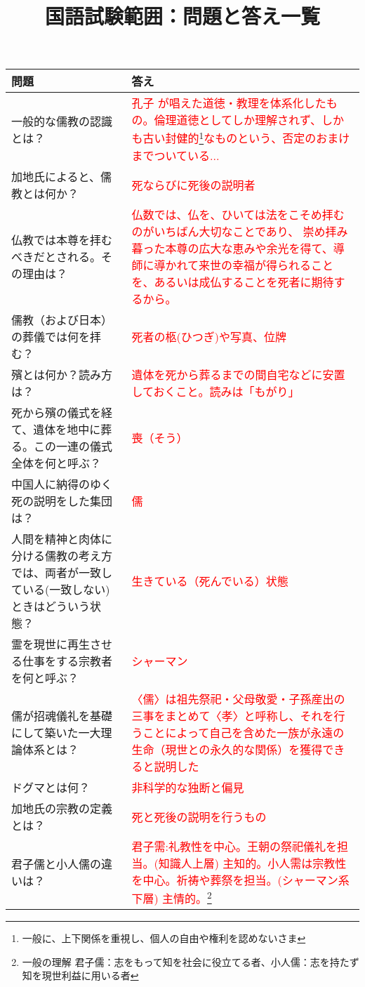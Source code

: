 \documentclass[a4paper,10pt]{article}
\title{国語試験範囲：問題と答え一覧}
\date{}
\begin{document}
\maketitle
\vspace{-2cm}
\begin{longtable}{|p{}|p{}|}
\hline
\textbf{問題} & \textbf{答え} \\ \hline
一般的な儒教の認識とは？ & \textcolor{red}{孔子 が唱えた道徳・教理を体系化したもの。倫理道徳としてしか理解されず、しかも古い封健的\footnote{一般に、上下関係を重視し、個人の自由や権利を認めないさま}なものという、否定のおまけまでついている...} \\ \hline
加地氏によると、儒教とは何か？ & \textcolor{red}{死ならびに死後の説明者} \\ \hline
仏教では本尊を拝むべきだとされる。その理由は？ & \textcolor{red}{仏数では、仏を、ひいては法をこそめ拝むのがいちばん大切なことであり、
崇め拝み暮った本尊の広大な恵みや余光を得て、導師に導かれて来世の幸福が得られることを、あるいは成仏することを死者に期待するから。} \\ \hline
儒教（および日本）の葬儀では何を拝む？ & \textcolor{red}{死者の柩(ひつぎ)や写真、位牌} \\ \hline
殯とは何か？読み方は？ & \textcolor{red}{遺体を死から葬るまでの間自宅などに安置しておくこと。読みは「もがり」} \\ \hline
死から殯の儀式を経て、遺体を地中に葬る。この一連の儀式全体を何と呼ぶ？ & \textcolor{red}{喪（そう）} \\ \hline
中国人に納得のゆく死の説明をした集団は？ & \textcolor{red}{儒} \\ \hline
人間を精神と肉体に分ける儒教の考え方では、両者が一致している(一致しない)ときはどういう状態？ & \textcolor{red}{生きている（死んでいる）状態} \\ \hline
霊を現世に再生させる仕事をする宗教者を何と呼ぶ？ & \textcolor{red}{シャーマン} \\ \hline
儒が招魂儀礼を基礎にして築いた一大理論体系とは？ & \textcolor{red}{〈儒〉は祖先祭祀・父母敬愛・子孫産出の三事をまとめて〈孝〉と呼称し、それを行うことによって自己を含めた一族が永遠の生命（現世との永久的な関係）を獲得できると説明した} \\ \hline
ドグマとは何？ & \textcolor{red}{非科学的な独断と偏見} \\ \hline
加地氏の宗教の定義とは？ & \textcolor{red}{死と死後の説明を行うもの} \\ \hline
君子儒と小人儒の違いは？ & \textcolor{red}{君子需:礼教性を中心。王朝の祭祀儀礼を担当。(知識人上層) 主知的。小人需は宗教性を中心。祈祷や葬祭を担当。(シャーマン系下層) 主情的。\footnote{一般の理解 君子儒：志をもって知を社会に役立てる者、小人儒：志を持たず知を現世利益に用いる者}} \\ \hline

\end{longtable}
\end{document}
